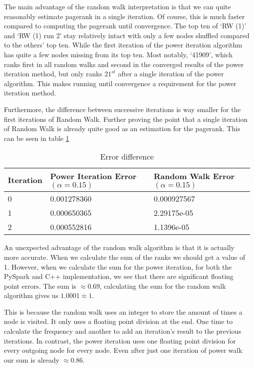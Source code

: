 \documentclass{article}
\begin{document}
The main advantage of the random walk interpretation is that we can quite reasonably estimate pagerank in a single iteration. Of course, this is much faster compared to computing the pagerank until convergence.  The top ten of `RW (1)' and `RW (1) run 2' stay relatively intact with only a few nodes shuffled compared to the others' top ten. While the first iteration of the power iteration algorithm has quite a few nodes missing from its top ten. Most notably, `41909', which ranks first in all random walks and second in the converged results of the power iteration method, but only ranks $21^{st}$ after a single iteration of the power algorithm. This makes running until convergence a requirement for the power iteration method.


Furthermore, the difference between successive iterations is way smaller for the first iterations of Random Walk. Further proving the point that a single iteration of Random Walk is already quite good as an estimation for the pagerank. This can be seen in table \ref{tab:error-diff}

\begin{table}[H]
    \centering
    \begin{tabular}{ | p{3cm} | p{3cm} | p{3cm} |}
        \hline
        \textbf{Iteration} & Power Iteration \newline Error $(\alpha = 0.15)$ & Random Walk \newline Error $(\alpha = 0.15)$ \\ \hline
        0 & 0.001278360 & 0.000927567 \\ \hline
        1 & 0.000650365 & 2.29175e-05 \\ \hline
        2 & 0.000552816 & 1.1396e-05 \\ \hline 
    \end{tabular}
    \caption{Error difference}
    \label{tab:error-diff}
\end{table}

An unexpected advantage of the random walk algorithm is that it is actually more accurate. When we calculate the sum of the ranks we should get a value of 1. However, when we calculate the sum for the power iteration, for both the PySpark and C++ implementation, we see that there are significant floating point errors. The sum is $\approx 0.69$, calculating the sum for the random walk algorithm gives us $ 1.0001 \approx 1 $.

This is because the random walk uses an integer to store the amount of times a node is visited. It only uses a floating point division at the end. One time to calculate the frequency and another to add an iteration's result to the previous iterations. In contrast, the power iteration uses one floating point division for every outgoing node for every node. Even after just one iteration of power walk our sum is already $ \approx 0.86$.
\end{document}
